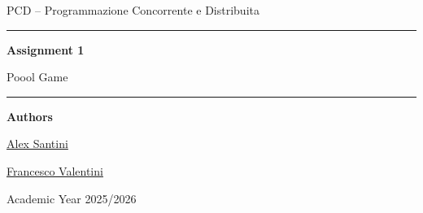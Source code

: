 \begin{titlepage}
    \centering
    \vspace*{2.2cm}

    {\Large PCD -- Programmazione Concorrente e Distribuita\par}
    \vspace{1.2cm}
    {\rule{0.82\textwidth}{0.5pt}\par}
    \vspace{0.9cm}
    {\huge\bfseries Assignment 1\par}
    \vspace{0.35cm}
    {\LARGE Poool Game\par}
    \vspace{0.45cm}
    \vspace{0.9cm}
    {\rule{0.82\textwidth}{0.5pt}\par}

    \vspace{1.6cm}
    {\large\textbf{Authors}\par}
    \vspace{0.25cm}
    {\large \href{https://github.com/AlexSantini10}{Alex Santini}\par}
    {\large \href{https://github.com/Val0rous}{Francesco Valentini}\par}

    \vfill
    {\large Academic Year 2025/2026\par}
    {\large \todayFullUS\par}
\end{titlepage}